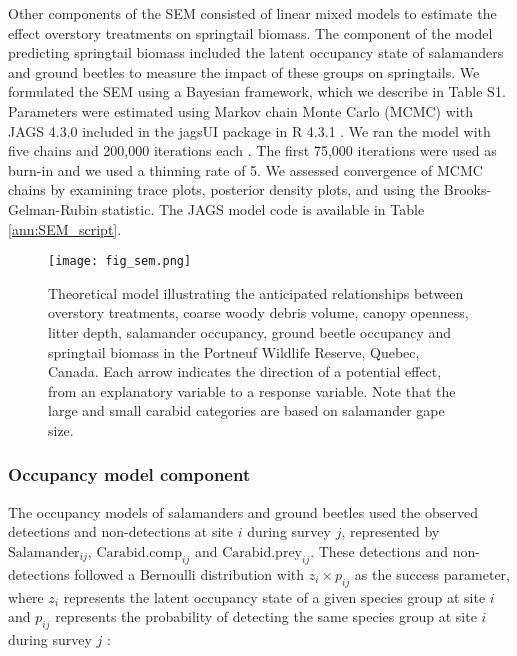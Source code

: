 Other components of the SEM consisted of linear mixed models to estimate the effect overstory treatments on springtail biomass. 
The component of the model predicting springtail biomass included the latent occupancy state of salamanders and ground beetles to measure the impact of these groups on springtails. 
We formulated the SEM using a Bayesian framework, which we describe in Table S1. 
Parameters were estimated using Markov chain Monte Carlo (MCMC) with JAGS 4.3.0 included in the jagsUI package in R 4.3.1 \citep{lunnBUGSProjectEvolution2009,rcoreteamLanguageEnvironmentStatistical2020,kellnerJagsUIWrapperRjags2024}. 
We ran the model with five chains and 200,000 iterations each \citep{gelmanUnderstandingPredictiveInformation2014}. 
The first 75,000 iterations were used as burn-in and we used a thinning rate of 5. 
We assessed convergence of MCMC chains by examining trace plots, posterior density plots, and using the Brooks-Gelman-Rubin statistic. 
The JAGS model code is available in Table \ref{ann:SEM_script}.


\begin{figure}[ht!]
	\centering
	\texttt{[image: fig\_sem.png]}
	\caption[Theoretical model illustrating the anticipated relationships between overstory treatments, environmental variables and species groups.]
  {Theoretical model illustrating the anticipated relationships between overstory treatments, coarse woody debris volume, canopy openness, litter depth,
   salamander occupancy, ground beetle occupancy and springtail biomass in the Portneuf Wildlife Reserve, Quebec, Canada. 
   Each arrow indicates the direction of a potential effect, from an explanatory variable to a response variable. 
   Note that the large and small carabid categories are based on salamander gape size.}
	\label{fig:SEM}
\end{figure} 

\subsubsection{Occupancy model component} 


The occupancy models of salamanders and ground beetles used the observed detections and non-detections at site $i$ during survey $j$, 
represented by $\text{Salamander}_{ij}$, $\text{Carabid.comp}_{ij}$ and $\text{Carabid.prey}_{ij}$. These detections and non-detections followed a Bernoulli distribution with $z_{i} \times p_{ij}$ as the success parameter, 
where $z_{i}$ represents the latent occupancy state of a given species group at site $i$ and $p_{ij}$ represents the probability of detecting the same species group at site $i$ during survey $j$ :


